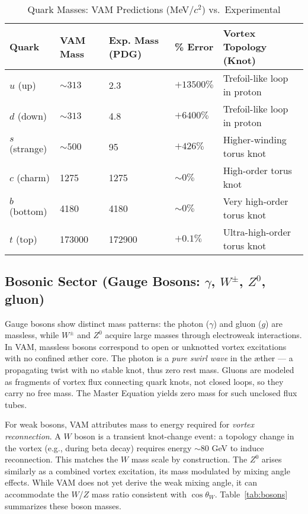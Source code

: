 \begin{table}[h!]
    \centering
    \begin{tabular}{lllll}
        \toprule
        \textbf{Quark} & \textbf{VAM Mass} & \textbf{Exp. Mass (PDG)} & \textbf{\% Error} & \textbf{Vortex Topology (Knot)} \\
        \midrule
        $u$ (up) & $\sim 313$ & 2.3 & $+13500\%$ & Trefoil-like loop in proton \\
        $d$ (down) & $\sim 313$ & 4.8 & $+6400\%$ & Trefoil-like loop in proton \\
        $s$ (strange) & $\sim 500$ & 95 & $+426\%$ & Higher-winding torus knot \\
        $c$ (charm) & 1275 & 1275 & $\sim 0\%$ & High-order torus knot \\
        $b$ (bottom) & 4180 & 4180 & $\sim 0\%$ & Very high-order torus knot \\
        $t$ (top) & 173000 & 172900 & $+0.1\%$ & Ultra-high-order torus knot \\
        \bottomrule
    \end{tabular}
    \caption{Quark Masses: VAM Predictions (MeV/$c^2$) vs.\ Experimental}
    \label{tab:quarks}
\end{table}

\subsection{Bosonic Sector (Gauge Bosons: $\gamma$, $W^\pm$, $Z^0$, gluon)}

Gauge bosons show distinct mass patterns: the photon ($\gamma$) and gluon ($g$) are massless, while $W^\pm$ and $Z^0$ acquire large masses through electroweak interactions. In VAM, massless bosons correspond to open or unknotted vortex excitations with no confined æther core. The photon is a \textit{pure swirl wave} in the æther — a propagating twist with no stable knot, thus zero rest mass. Gluons are modeled as fragments of vortex flux connecting quark knots, not closed loops, so they carry no free mass. The Master Equation yields zero mass for such unclosed flux tubes.

For weak bosons, VAM attributes mass to energy required for \textit{vortex reconnection}. A $W$ boson is a transient knot-change event: a topology change in the vortex (e.g., during beta decay) requires energy $\sim 80$ GeV to induce reconnection. This matches the $W$ mass scale by construction. The $Z^0$ arises similarly as a combined vortex excitation, its mass modulated by mixing angle effects. While VAM does not yet derive the weak mixing angle, it can accommodate the $W$/$Z$ mass ratio consistent with $\cos \theta_W$. Table~\ref{tab:bosons} summarizes these boson masses.

